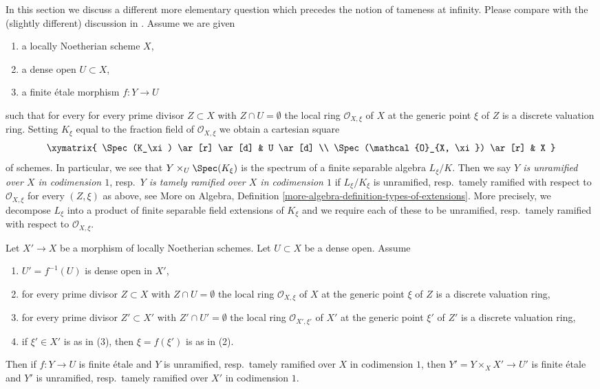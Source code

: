 \medskip\noindent
In this section we discuss a different more elementary question which
precedes the notion of tameness at infinity.
Please compare with the (slightly different)
discussion in \cite{Grothendieck-Murre}.
Assume we are given
\begin{enumerate}
\item a locally Noetherian scheme $X$,
\item a dense open $U \subset X$,
\item a finite \'etale morphism $f : Y \to U$
\end{enumerate}
such that for every for every prime divisor $Z \subset X$
with $Z \cap U = \emptyset$ the local ring $\mathcal{O}_{X, \xi}$
of $X$ at the generic point $\xi$ of $Z$ is a discrete valuation ring.
Setting $K_\xi$ equal to the fraction field of $\mathcal{O}_{X, \xi}$
we obtain a cartesian square
$$
\xymatrix{
\Spec(K_\xi) \ar[r] \ar[d] & U \ar[d] \\
\Spec(\mathcal{O}_{X, \xi}) \ar[r] & X
}
$$
of schemes. In particular, we see that $Y \times_U \Spec(K_\xi)$
is the spectrum of a finite separable algebra $L_\xi/K$.
Then we say
{\it $Y$ is unramified over $X$ in codimension $1$},
resp.\ {\it $Y$ is tamely ramified over $X$ in codimension $1$}
if $L_\xi/K_\xi$ is unramified, resp.\ tamely ramified
with respect to $\mathcal{O}_{X, \xi}$ for every $(Z, \xi)$
as above, see More on Algebra, Definition
\ref{more-algebra-definition-types-of-extensions}.
More precisely, we decompose $L_\xi$ into a product of finite
separable field extensions of $K_\xi$ and we require each of these
to be unramified, resp.\ tamely ramified with respect to
$\mathcal{O}_{X, \xi}$.

\begin{lemma}
\label{lemma-pullback-tame-codim1}
Let $X' \to X$ be a morphism of locally Noetherian schemes.
Let $U \subset X$ be a dense open. Assume
\begin{enumerate}
\item $U' = f^{-1}(U)$ is dense open in $X'$,
\item for every prime divisor $Z \subset X$ with $Z \cap U = \emptyset$
the local ring $\mathcal{O}_{X, \xi}$ of $X$ at the generic point $\xi$
of $Z$ is a discrete valuation ring,
\item for every prime divisor $Z' \subset X'$
with $Z' \cap U' = \emptyset$ the local ring $\mathcal{O}_{X', \xi'}$
of $X'$ at the generic point $\xi'$ of $Z'$ is a discrete valuation ring,
\item if $\xi' \in X'$ is as in (3), then $\xi = f(\xi')$ is as in (2).
\end{enumerate}
Then if $f : Y \to U$ is finite \'etale and
$Y$ is unramified, resp.\ tamely ramified over $X$
in codimension $1$, then $Y' = Y \times_X X' \to U'$ is finite \'etale
and $Y'$ is unramified, resp.\ tamely ramified over $X'$ in codimension $1$.
\end{lemma}

